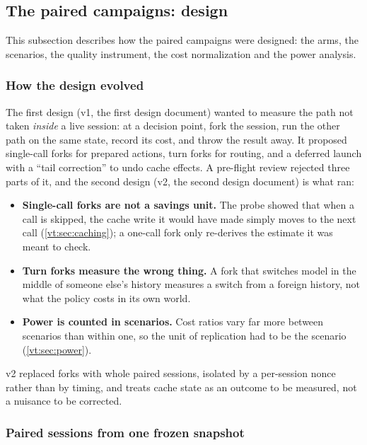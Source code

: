 \documentclass[11pt,letterpaper]{article}
\begin{document}
\subsection{The paired campaigns: design}\label{vt:sec:design}

This subsection describes how the paired campaigns were designed: the arms, the scenarios, the quality instrument,
the cost normalization and the power analysis.

\subsubsection{How the design evolved}\label{vt:sec:evolution}

The first design (v1, the first design document) wanted to measure the path not taken
\emph{inside} a live session: at a decision point, fork the session, run the other path on the same state, record
its cost, and throw the result away. It proposed single-call forks for prepared actions, turn forks for routing,
and a deferred launch with a ``tail correction'' to undo cache effects. A pre-flight review rejected three parts
of it, and the second design (v2, the second design document) is what ran:
\begin{itemize}
  \item \textbf{Single-call forks are not a savings unit.} The probe showed that when a call is skipped, the cache
    write it would have made simply moves to the next call (\cref{vt:sec:caching}); a one-call fork only re-derives
    the estimate it was meant to check.
  \item \textbf{Turn forks measure the wrong thing.} A fork that switches model in the middle of someone else's
    history measures a switch from a foreign history, not what the policy costs in its own world.
  \item \textbf{Power is counted in scenarios.} Cost ratios vary far more between scenarios than within one, so
    the unit of replication had to be the scenario (\cref{vt:sec:power}).
\end{itemize}
v2 replaced forks with whole paired sessions, isolated by a per-session nonce rather than by timing, and treats
cache state as an outcome to be measured, not a nuisance to be corrected.

\subsubsection{Paired sessions from one frozen snapshot}
\end{document}
